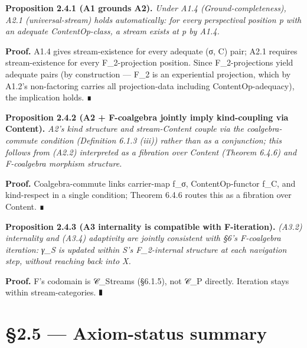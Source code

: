 \documentclass[11pt, openany]{book}
\newcommand{\sectionbreak}{\clearpage}
\begin{document}
\textbf{Proposition 2.4.1 (A1 grounds A2).} \textit{Under A1.4 (Ground-completeness), A2.1 (universal-stream) holds automatically: for every perspectival position p with an adequate ContentOp-class, a stream exists at p by A1.4.}

\textbf{Proof.} A1.4 gives stream-existence for every adequate (σ, C) pair; A2.1 requires stream-existence for every F\_\allowbreak{}2-projection position. Since F\_\allowbreak{}2-projections yield adequate pairs (by construction --- F\_\allowbreak{}2 is an experiential projection, which by A1.2's non-factoring carries all projection-data including ContentOp-adequacy), the implication holds. ∎

\textbf{Proposition 2.4.2 (A2 + F-coalgebra jointly imply kind-coupling via Content).} \textit{A2's kind structure and stream-Content couple via the coalgebra-commute condition (Definition 6.1.3 (iii)) rather than as a conjunction; this follows from (A2.2) interpreted as a fibration over Content (Theorem 6.4.6) and F-coalgebra morphism structure.}

\textbf{Proof.} Coalgebra-commute links carrier-map f\_\allowbreak{}σ, ContentOp-functor f\_\allowbreak{}C, and kind-respect in a single condition; Theorem 6.4.6 routes this as a fibration over Content. ∎

\textbf{Proposition 2.4.3 (A3 internality is compatible with F-iteration).} \textit{(A3.2) internality and (A3.4) adaptivity are jointly consistent with §6's F-coalgebra iteration: γ\_\allowbreak{}S is updated within S's F\_\allowbreak{}2-internal structure at each navigation step, without reaching back into X.}

\textbf{Proof.} F's codomain is 𝒞\_\allowbreak{}Streams (§6.1.5), not 𝒞\_\allowbreak{}P directly. Iteration stays within stream-categories. ∎

\sectionbreak

\section{§2.5 --- Axiom-status summary}
\end{document}

